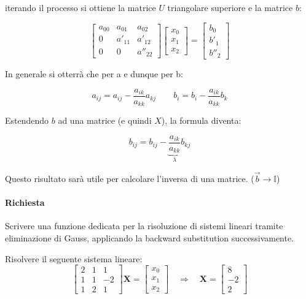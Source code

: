 iterando il processo si ottiene la matrice $U$ triangolare superiore e la matrice $b$:

$$
	\begin{bmatrix}
		a_{00} & a_{01}  & a_{02}   \\
		0      & a'_{11} & a'_{12}  \\
		0      & 0       & a''_{22}
	\end{bmatrix} \begin{bmatrix}
		x_0 \\ x_1 \\ x_2 \end{bmatrix} = \begin{bmatrix}
		b_0 \\ b'_1 \\ b''_2 \end{bmatrix}
$$

In generale si otterrà che per a e dunque per b:

$$
	a_{ij} = a_{ij} - \frac{a_{ik}}{a_{kk}} a_{kj} \quad \quad b_i = b_i - \frac{a_{ik}}{a_{kk}} b_k
$$

Estendendo $b$ ad una matrice (e quindi $X$), la formula diventa:

$$
	b_{ij} = b_{ij} - \underbrace{\frac{a_{ik}}{a_{kk}}}_{\lambda} b_{kj}
$$

Questo risultato sarà utile per calcolare l'inversa di una matrice. ($\vec{b} \rightarrow \mathbb{I}$)

\paragraph{Richiesta}

Scrivere una funzione dedicata per la risoluzione di sistemi lineari tramite
eliminazione di Gauss, applicando la backward substitution successivamente.

Risolvere il seguente sistema lineare:
$$
	\begin{bmatrix}
		2 & 1 & 1  \\
		1 & 1 & -2 \\
		1 & 2 & 1
	\end{bmatrix} \mathbf{X} = \begin{bmatrix}
		x_0 \\ x_1 \\ x_2 \end{bmatrix}
	\quad \Rightarrow \quad \mathbf{X} = \begin{bmatrix} 8 \\ -2 \\ 2 \end{bmatrix}
$$

